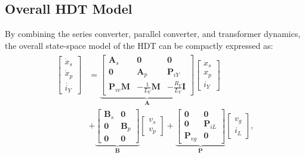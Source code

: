\subsection{Overall HDT Model}

By combining the series converter, parallel converter, and transformer dynamics, the overall state-space model of the HDT can be compactly expressed as:
\begin{align}
    \begin{aligned}
        \begin{bmatrix}
            \dot{x}_s\\
            \dot{x}_p\\
            \dot{i_Y}
        \end{bmatrix}
        &=
        \underbrace{\begin{bmatrix}
            \mathbf{A}_s & \mathbf{0} & \mathbf{0}\\
            \mathbf{0} & \mathbf{A}_p & \mathbf{P}_{iY}\\
            \mathbf{P}_{vc}\mathbf{M} & -\tfrac{1}{L_Y}\mathbf{M} & -\tfrac{R_Y}{L_Y}\mathbf{I}
        \end{bmatrix}}_{\mathbf{A}}
        \begin{bmatrix}
            x_s\\
            x_p\\
            i_Y
        \end{bmatrix}
        \\
        &+
        \underbrace{\begin{bmatrix}
            \mathbf{B}_s & \mathbf{0}\\
            \mathbf{0} & \mathbf{B}_p\\
            \mathbf{0} & \mathbf{0}
        \end{bmatrix}}_{\mathbf{B}}
        \begin{bmatrix}
            v_s\\[2pt]
            v_p
        \end{bmatrix} \nonumber
        +
        \underbrace{\begin{bmatrix}
            \mathbf{0} & \mathbf{0}\\
            \mathbf{0} & \mathbf{P}_{iL}\\
            \mathbf{P}_{vg} & \mathbf{0}
        \end{bmatrix}}_{\mathbf{P}}
        \begin{bmatrix}
            v_g\\
            i_L
        \end{bmatrix},
        \label{eq:HDT_compact}
    \end{aligned}
\end{align}
